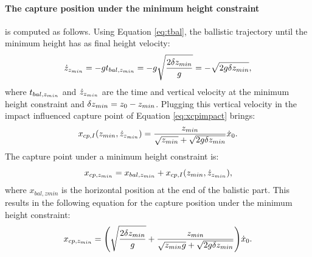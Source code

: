 \paragraph{The capture position under the minimum height constraint} is computed as follows. Using Equation \ref{eq:tbal}, the ballistic trajectory until the minimum height has as final height velocity:
\begin{equation}
	\dot{z}_{z_{min}} = -gt_{bal,z_{min}} = -g\sqrt{\frac{2\delta{z_{min}}}{g}} = -\sqrt{2g\delta{z_{min}}},
\end{equation}
where $t_{bal,z_{min}}$ and $\dot{z}_{z_{min}}$ are the time and vertical velocity at the minimum height constraint and $\delta{z_{min}}=z_0-z_{min}$. Plugging this vertical velocity in the impact influenced capture point of Equation \eqref{eq:xcpimpact} brings:
\begin{equation}
	x_{cp,I}(z_{min}, \dot{z}_{z_{min}})= \frac{z_{min}}{\sqrt{z_{min}}+\sqrt{2g\delta{z_{min}}}}\dot{x}_0.
\end{equation}
The capture point under a minimum height constraint is:
\begin{equation}
	x_{cp,z_{min}} =x_{bal,z_{min}}+x_{cp,I}(z_{min}, \dot{z}_{z_{min}}) ,
\end{equation}
where  $x_{bal,zmin}$ is the horizontal position at the end of the balistic part. This results in the following equation for the capture position under the minimum height constraint:
\begin{equation}
 x_{cp,z_{min}}=\Bigg(\sqrt{\frac{2\delta{z_{min}}}{g}} +\frac{z_{min}}{\sqrt{z_{min} g}+\sqrt{2g\delta{z_{min}}}}\Bigg)\dot{x}_0.
\end{equation}
